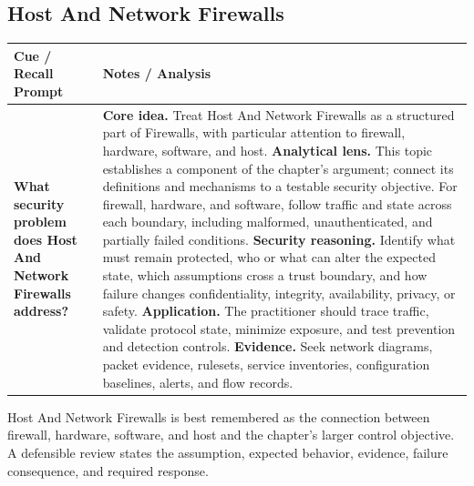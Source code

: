 \documentclass[11pt]{article}
\newcommand{\CornellHeader}{%
\rowcolor{Navy}\color{white}\bfseries Cue / Recall Prompt & \color{white}\bfseries Notes / Analysis\\\hline}
\newcommand{\CornellRow}[2]{%
\cellcolor{CueGray}\RaggedRight\textbf{#1} & \RaggedRight #2\\\hline}
\begin{document}
\subsection*{Host And Network Firewalls}
\begin{longtable}{>{\RaggedRight\arraybackslash}p{}|>{\RaggedRight\arraybackslash}p{}}
\CornellHeader
\CornellRow{What security problem does Host And Network Firewalls address?}{\textbf{Core idea.} Treat Host And Network Firewalls as a structured part of Firewalls, with particular attention to firewall, hardware, software, and host. \textbf{Analytical lens.} This topic establishes a component of the chapter's argument; connect its definitions and mechanisms to a testable security objective. For firewall, hardware, and software, follow traffic and state across each boundary, including malformed, unauthenticated, and partially failed conditions. \textbf{Security reasoning.} Identify what must remain protected, who or what can alter the expected state, which assumptions cross a trust boundary, and how failure changes confidentiality, integrity, availability, privacy, or safety. \textbf{Application.} The practitioner should trace traffic, validate protocol state, minimize exposure, and test prevention and detection controls. \textbf{Evidence.} Seek network diagrams, packet evidence, rulesets, service inventories, configuration baselines, alerts, and flow records.}
\end{longtable}
\begin{topicsummary}
Host And Network Firewalls is best remembered as the connection between firewall, hardware, software, and host and the chapter's larger control objective. A defensible review states the assumption, expected behavior, evidence, failure consequence, and required response.
\end{topicsummary}
\end{document}
